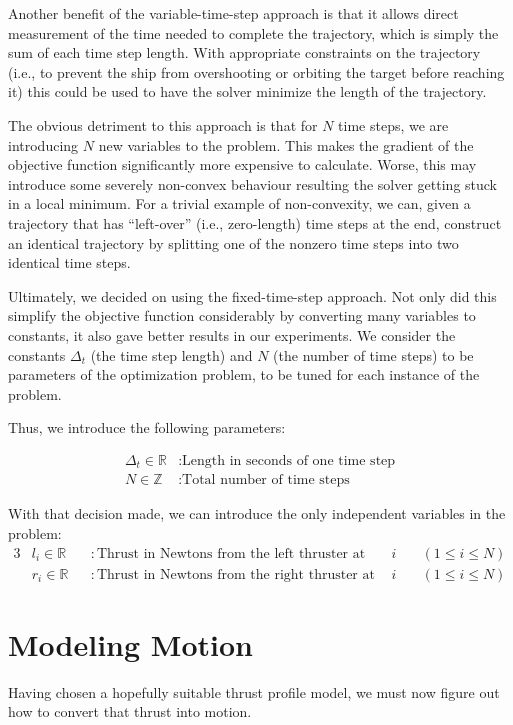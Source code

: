 \documentclass{report}
\begin{document}
Another benefit of the variable-time-step approach is that it allows direct measurement of the time
needed to complete the trajectory, which is simply the sum of each time step length.
With appropriate constraints on the trajectory (i.e., to prevent the ship from overshooting
or orbiting the target before reaching it) this could be used to have the solver minimize the 
length of the trajectory.

The obvious detriment to this approach is that for $N$ time steps, we are introducing $N$ new
variables to the problem. This makes the gradient of the objective function significantly
more expensive to calculate. Worse, this may introduce some severely non-convex behaviour
resulting the solver getting stuck in a local minimum. For a trivial example of non-convexity,
we can, given a trajectory that has
``left-over'' (i.e., zero-length) time steps at the end, construct an identical
trajectory by splitting one of the nonzero time steps into two identical time steps.

Ultimately, we decided on using the fixed-time-step approach. Not only did this simplify the
objective function considerably by converting many variables to constants, it also
gave better results in our experiments. We consider the constants $\Delta_t$ (the time step
length) and $N$ (the number of time steps) to be parameters of the optimization problem, to
be tuned for each instance of the problem.

Thus, we introduce the following parameters:

\begin{align*}
    \Delta_t \in \mathbb{R} &: \text{Length in seconds of one time step} \\
    N \in \mathbb{Z} &: \text{Total number of time steps}
\end{align*}

With that decision made, we can introduce the only independent variables in the problem:
\begin{alignat*}{3}
    & l_i \in \mathbb{R} &&: \text{Thrust in Newtons from the left thruster at time $i$} && \quad (1 \leq i \leq N) \\
    & r_i \in \mathbb{R} &&: \text{Thrust in Newtons from the right thruster at time $i$} && \quad (1 \leq i \leq N)
\end{alignat*}

\section{Modeling Motion} \label{sec:motion}
Having chosen a hopefully suitable thrust profile model, we must now figure out how to
convert that thrust into motion.
\end{document}
